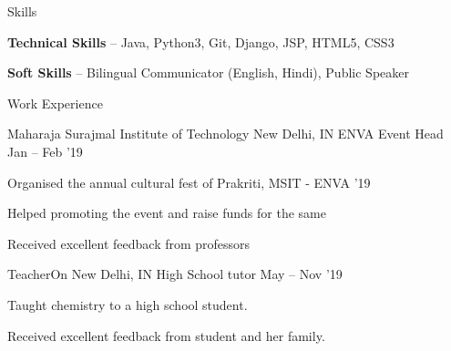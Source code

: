 \documentclass{resume} %
\begin{document}

\begin{rSection}{Skills}
  \begin{rSkillSection}
    \item \textbf {Technical Skills} -- Java, Python3, Git, Django, JSP, HTML5, CSS3
    \vspace{3mm}
    \item \textbf {Soft Skills} --  Bilingual Communicator (English, Hindi), Public Speaker
    \vspace{3mm}
  \end{rSkillSection}
\end{rSection}


\begin{rSection}{Work Experience}
  \begin{rWorkSection}{Maharaja Surajmal Institute of Technology}
                           {New Delhi, IN}
                           {ENVA Event Head}
                           {Jan -- Feb '19}
  {
    \item Organised the annual cultural fest of Prakriti, MSIT - ENVA '19
    \item Helped promoting the event and raise funds for the same
    \item Received excellent feedback from professors
  }
  \end{rWorkSection}


  \begin{rWorkSection}{TeacherOn}
                     {New Delhi, IN}
                     {High School tutor}
                     {May -- Nov '19}
  {
    \item Taught chemistry to a high school student.
    \item Received excellent feedback from student and her family.
  }
  \end{rWorkSection}
\end{rSection}

\end{document}
